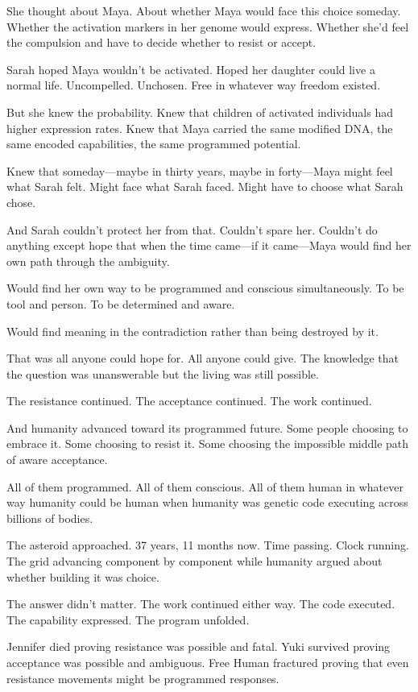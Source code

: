 She thought about Maya. About whether Maya would face this choice someday. Whether the activation markers in her genome would express. Whether she'd feel the compulsion and have to decide whether to resist or accept.

Sarah hoped Maya wouldn't be activated. Hoped her daughter could live a normal life. Uncompelled. Unchosen. Free in whatever way freedom existed.

But she knew the probability. Knew that children of activated individuals had higher expression rates. Knew that Maya carried the same modified DNA, the same encoded capabilities, the same programmed potential.

Knew that someday—maybe in thirty years, maybe in forty—Maya might feel what Sarah felt. Might face what Sarah faced. Might have to choose what Sarah chose.

And Sarah couldn't protect her from that. Couldn't spare her. Couldn't do anything except hope that when the time came—if it came—Maya would find her own path through the ambiguity.

Would find her own way to be programmed and conscious simultaneously. To be tool and person. To be determined and aware.

Would find meaning in the contradiction rather than being destroyed by it.

That was all anyone could hope for. All anyone could give. The knowledge that the question was unanswerable but the living was still possible.

The resistance continued. The acceptance continued. The work continued.

And humanity advanced toward its programmed future. Some people choosing to embrace it. Some choosing to resist it. Some choosing the impossible middle path of aware acceptance.

All of them programmed. All of them conscious. All of them human in whatever way humanity could be human when humanity was genetic code executing across billions of bodies.

The asteroid approached. 37 years, 11 months now. Time passing. Clock running. The grid advancing component by component while humanity argued about whether building it was choice.

The answer didn't matter. The work continued either way. The code executed. The capability expressed. The program unfolded.

Jennifer died proving resistance was possible and fatal. Yuki survived proving acceptance was possible and ambiguous. Free Human fractured proving that even resistance movements might be programmed responses.

